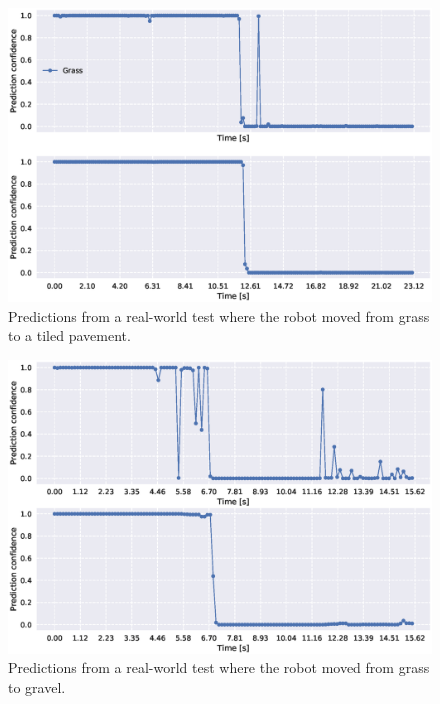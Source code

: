 \begin{figure}
	\centering
	\includegraphics[scale=0.5]{figs_temp/transition_grass_tiles_grass}
	\caption{Predictions from a real-world test where the robot moved from grass to a tiled pavement.} 
	\label{fig:trans_tgtg}
\end{figure}

\begin{figure}
	\centering
	\includegraphics[scale=0.5]{figs_temp/transition_grass_gravel2}
	\caption{Predictions from a real-world test where the robot moved from grass to gravel.}
	\label{fig:trans_gg}
\end{figure}


